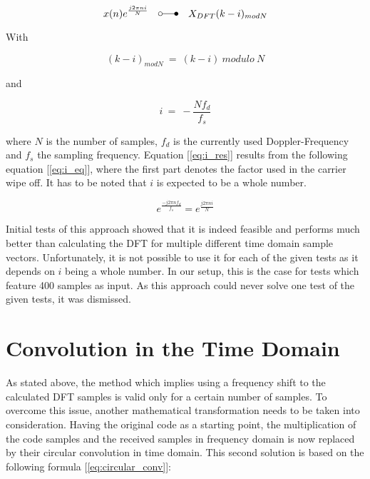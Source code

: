 			\begin{equation} 
				\label{eq:freq_dom_shift}
				x(n)e^{\frac{j2{\pi}ni}{N}}\quad \laplace\quad X_{DFT}(k-i)_{mod N} %
			\end{equation}

			With 

			\begin{equation} 
				(k-i)_{mod N}\ =\ (k-i)\ modulo\ N
			\end{equation}

			and 

			\begin{equation}
				\label{eq:i_res}
				i\ =\ -\frac{Nf_d}{f_s}
			\end{equation}

			where $N$ is the number of samples, $f_d$ is the currently used Doppler-Frequency and $f_s$ the sampling frequency. Equation [\ref{eq:i_res}] results from the following equation [\ref{eq:i_eq}], where the first part denotes the factor used in the carrier wipe off. It has to be noted that $i$ is expected to be a whole number.

			\begin{equation} 
				\label{eq:i_eq}
				e^{\frac{-j2{\pi}nf_d}{f_s}} = e^{\frac{j2{\pi}ni}{N}}
			\end{equation}

			Initial tests of this approach showed that it is indeed feasible and performs much better than calculating the DFT for multiple different time domain sample vectors. Unfortunately, it is not possible to use it for each of the given tests as it depends on $i$ being a whole number. In our setup, this is the case for tests which feature \num{400} samples as input. As this approach could never solve one test of the given tests, it was dismissed.
		
		\section{Convolution in the Time Domain} %
		\label{sec:convolution_in_the_time_domain}
	  		As stated above, the method which implies using a frequency shift to the calculated DFT samples is valid only for a certain number of samples. To overcome this issue, another mathematical transformation needs to be taken into consideration. Having the original code as a starting point, the multiplication of the code samples and the received samples in frequency domain is now replaced by their circular convolution in time domain. This second solution is based on the following formula [\ref{eq:circular_conv}]:


